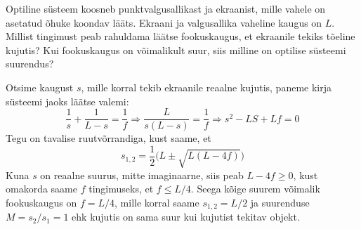
Optiline süsteem koosneb punktvalgusallikast ja ekraanist, mille vahele on asetatud õhuke koondav lääts. Ekraani ja valgusallika vaheline kaugus on $L$. Millist tingimust peab rahuldama läätse fookuskaugus, et ekraanile tekiks tõeline kujutis? Kui fookuskaugus on võimalikult suur, siis milline on optilise süsteemi suurendus?


\hint

\solu
Otsime kaugust $s$, mille korral tekib ekraanile reaalne kujutis, paneme kirja süsteemi jaoks läätse valemi:
$$\frac{1}{s}+\frac{1}{L-s}=\frac{1}{f}\Rightarrow \frac{L}{s(L-s)}=\frac{1}{f} \Rightarrow s^2-LS+Lf=0$$
Tegu on tavalise ruutvõrrandiga, kust saame, et $$s_{1,2}=\frac{1}{2}\big(L\pm\sqrt{L(L-4f)}\big)$$
Kuna $s$ on reaalne suurus, mitte imaginaarne, siis peab $L-4f \geq 0$, kust omakorda saame $f$ tingimuseks, et $f \leq L/4$. Seega kõige suurem võimalik fookuskaugus on $f = L/4$, mille korral saame $s_{1,2} = L/2$ ja suurenduse $M=s_2/s_1 = 1$ ehk kujutis on sama suur kui kujutist tekitav objekt.
\probend